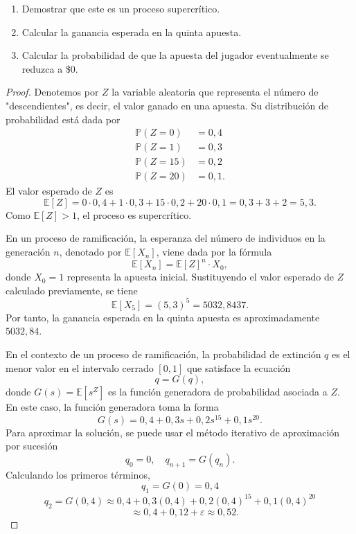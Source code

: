 \documentclass{article}
\begin{document}
\begin{enumerate}[label=(\alph*)]
    \item Demostrar que este es un proceso supercrítico.
    \item Calcular la ganancia esperada en la quinta apuesta.
    \item Calcular la probabilidad de que la apuesta del jugador eventualmente se reduzca a \$0.
\end{enumerate}

\begin{proof}

\item[(a)] Denotemos por \( Z \) la variable aleatoria que representa el número de "descendientes", es decir, el valor ganado en una apuesta. Su distribución de probabilidad está dada por
\[
\begin{aligned}
    \mathbb{P}(Z = 0) &= 0{,}4 \\
    \mathbb{P}(Z = 1) &= 0{,}3 \\
    \mathbb{P}(Z = 15) &= 0{,}2 \\
    \mathbb{P}(Z = 20) &= 0{,}1.
\end{aligned}
\]
El valor esperado de \( Z \) es
\[
\mathbb{E}[Z] = 0 \cdot 0{,}4 + 1 \cdot 0{,}3 + 15 \cdot 0{,}2 + 20 \cdot 0{,}1 = 0{,}3 + 3 + 2 = 5{,}3.
\]
Como \( \mathbb{E}[Z] > 1 \), el proceso es supercrítico.

\item[(b)] En un proceso de ramificación, la esperanza del número de individuos en la generación \(n\), denotado por \( \mathbb{E}[X_n] \), viene dada por la fórmula
\[
\mathbb{E}[X_n] = \mathbb{E}[Z]^n \cdot X_0,
\]
donde \( X_0 = 1 \) representa la apuesta inicial.
Sustituyendo el valor esperado de \(Z\) calculado previamente, se tiene
\[
\mathbb{E}[X_5] = (5{,}3)^5 = 5032{,}8437.
\]
Por tanto, la ganancia esperada en la quinta apuesta es aproximadamente \( 5032{,}84 \).

\item[(c)] En el contexto de un proceso de ramificación, la probabilidad de extinción \( q \) es el menor valor en el intervalo cerrado \([0,1]\) que satisface la ecuación 
\[
q = G(q),
\]
donde \( G(s) = \mathbb{E}[s^Z] \) es la función generadora de probabilidad asociada a \(Z\). En este caso, la función generadora toma la forma
\[
G(s) = 0{,}4 + 0{,}3s + 0{,}2s^{15} + 0{,}1s^{20}.
\]
Para aproximar la solución, se puede usar el método iterativo de aproximación por sucesión
\[
q_0 = 0, \quad q_{n+1} = G(q_n).
\]
Calculando los primeros términos,
\[
q_1 = G(0) = 0{,}4
\]
\[
q_2 = G(0{,}4) \approx 0{,}4 + 0{,}3(0{,}4) + 0{,}2(0{,}4)^{15} + 0{,}1(0{,}4)^{20}
\]
\[
\quad \approx 0{,}4 + 0{,}12 + \varepsilon \approx 0{,}52.
\]


\end{proof}
\end{document}
